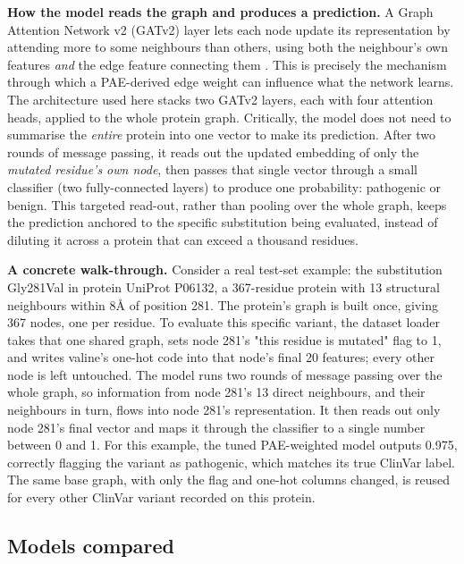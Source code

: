\documentclass[10pt,conference,a4paper]{IEEEtran}
\begin{document}
\textbf{How the model reads the graph and produces a prediction.} A Graph Attention Network v2 (GATv2) layer lets each node update its representation by attending more to some neighbours than others, using both the neighbour's own features \textit{and} the edge feature connecting them \cite{brody2022gatv2}. This is precisely the mechanism through which a PAE-derived edge weight can influence what the network learns. The architecture used here stacks two GATv2 layers, each with four attention heads, applied to the whole protein graph. Critically, the model does not need to summarise the \textit{entire} protein into one vector to make its prediction. After two rounds of message passing, it reads out the updated embedding of only the \textit{mutated residue's own node}, then passes that single vector through a small classifier (two fully-connected layers) to produce one probability: pathogenic or benign. This targeted read-out, rather than pooling over the whole graph, keeps the prediction anchored to the specific substitution being evaluated, instead of diluting it across a protein that can exceed a thousand residues.

\textbf{A concrete walk-through.} Consider a real test-set example: the substitution Gly281Val in protein UniProt P06132, a 367-residue protein with 13 structural neighbours within 8\r{A} of position 281. The protein's graph is built once, giving 367 nodes, one per residue. To evaluate this specific variant, the dataset loader takes that one shared graph, sets node 281's "this residue is mutated" flag to 1, and writes valine's one-hot code into that node's final 20 features; every other node is left untouched. The model runs two rounds of message passing over the whole graph, so information from node 281's 13 direct neighbours, and their neighbours in turn, flows into node 281's representation. It then reads out only node 281's final vector and maps it through the classifier to a single number between 0 and 1. For this example, the tuned PAE-weighted model outputs 0.975, correctly flagging the variant as pathogenic, which matches its true ClinVar label. The same base graph, with only the flag and one-hot columns changed, is reused for every other ClinVar variant recorded on this protein.

\subsection{Models compared}
\end{document}
